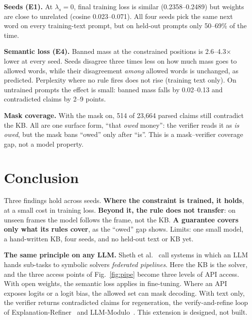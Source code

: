 \documentclass[letterpaper, 10pt, conference]{IEEEtran}
\begin{document}
\textbf{Seeds (E1).} At $\lambda_s{=}0$, final training loss is similar (0.2358--0.2489) but weights are close to unrelated (cosine 0.023--0.071). All four seeds pick the same next word on every training-text prompt, but on held-out prompts only 50--69\% of the time.

\textbf{Semantic loss (E4).} Banned mass at the constrained positions is 2.6--4.3$\times$ lower at every seed. Seeds disagree three times less on how much mass goes to allowed words, while their disagreement \emph{among} allowed words is unchanged, as predicted. Perplexity where no rule fires does not rise (training text only). On untrained prompts the effect is small: banned mass falls by 0.02--0.13 and contradicted claims by 2--9 points.

\textbf{Mask coverage.} With the mask on, 514 of 23,664 parsed claims still contradict the KB. All are one surface form, ``that \emph{owed} money'': the verifier reads it as \emph{is owed}, but the mask bans ``owed'' only after ``is''. This is a mask--verifier coverage gap, not a model property.

\section{Conclusion}
Three findings hold across seeds. \textbf{Where the constraint is trained, it holds}, at a small cost in training loss. \textbf{Beyond it, the rule does not transfer}: on unseen frames the model follows the frame, not the KB. \textbf{A guarantee covers only what its rules cover}, as the ``owed'' gap shows. Limits: one small model, a hand-written KB, four seeds, and no held-out text or KB yet.

\textbf{The same principle on any LLM.} Sheth et al.~\cite{sheth2023} call systems in which an LLM hands sub-tasks to symbolic solvers \emph{federated pipelines}. Here the KB is the solver, and the three access points of Fig.~\ref{fig:pipe} become three levels of API access. With open weights, the semantic loss applies in fine-tuning. Where an API exposes logits or a logit bias, the allowed set can mask decoding. With text only, the verifier returns contradicted claims for regeneration, the verify-and-refine loop of Explanation-Refiner~\cite{quan2024,quan2025} and LLM-Modulo~\cite{llmmodulo}. This extension is designed, not built.
\end{document}
